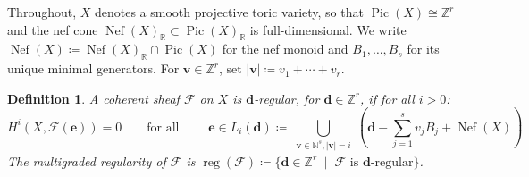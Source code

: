 \documentclass[11pt,reqno]{amsart}
\newtheorem{defn}[lemma]{Definition}
\theoremstyle{remark}
\newcommand{\reg}{\operatorname{reg}}
\newcommand{\Pic}{\operatorname{Pic}}
\newcommand{\Nef}{\operatorname{Nef}}
\newcommand{\dd}{\mathbf{d}}
\newcommand{\ee}{\mathbf{e}}
\newcommand{\vv}{\mathbf{v}}
\newcommand{\NN}{\mathbb{N}}
\newcommand{\RR}{\mathbb{R}}
\newcommand{\ZZ}{\mathbb{Z}}
\newcommand{\cF}{\mathcal{F}}
\begin{document}
Throughout, $X$ denotes a smooth projective toric variety, so that $\Pic(X)\cong \ZZ^r$ and the nef cone $\Nef(X)_{\RR} \subset \Pic(X)_{\RR}$ is full-dimensional. We write $\Nef(X)\coloneqq \Nef(X)_{\RR} \cap \Pic(X)$ for the nef monoid and $B_{1},\ldots,B_{s}$ for its unique minimal generators. For $\vv \in \ZZ^r$, set $|\vv|\coloneqq v_1+\cdots+v_r$.

\begin{defn}\cite[Def. 6.6]{maclaganSmith04}\label{def:mg-reg}
A coherent sheaf $\cF$ on $X$ is \emph{$\dd$-regular}, for $\dd\in\ZZ^r$, if for all $i>0$:
\[
H^i(X, \cF(\ee))=0 \qquad \text{for all } \qquad \ee \in L_{i}(\dd) \coloneqq \bigcup_{\substack{\vv\in \NN^s, |\vv|=i}} \left(\dd-\sum_{j=1}^{s}v_{j}B_j + \Nef(X)\right)
\]
The \emph{multigraded regularity} of $\cF$ is $\reg(\cF)\coloneqq \{\dd\in \ZZ^r \;\; | \;\; \text{$\cF$ is $\dd$-regular}\}$. 
\end{defn}
\end{document}
